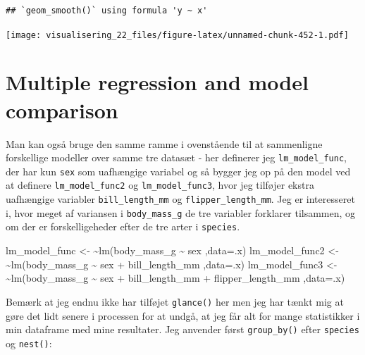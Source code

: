 \documentclass[
]{book}
\newenvironment{Shaded}{\begin{snugshade}}{\end{snugshade}}
\newcommand{\AttributeTok}[1]{\textcolor[rgb]{0.77,0.63,0.00}{#1}}
\newcommand{\ErrorTok}[1]{\textcolor[rgb]{0.64,0.00,0.00}{\textbf{#1}}}
\newcommand{\FunctionTok}[1]{\textcolor[rgb]{0.00,0.00,0.00}{#1}}
\newcommand{\NormalTok}[1]{#1}
\newcommand{\OtherTok}[1]{\textcolor[rgb]{0.56,0.35,0.01}{#1}}
\newcommand{\SpecialCharTok}[1]{\textcolor[rgb]{0.00,0.00,0.00}{#1}}
\begin{document}
\begin{verbatim}
## `geom_smooth()` using formula 'y ~ x'
\end{verbatim}

\texttt{[image: visualisering\_22\_files/figure-latex/unnamed-chunk-452-1.pdf]}

\hypertarget{multiple-regression-and-model-comparison}{%
\section{Multiple regression and model comparison}\label{multiple-regression-and-model-comparison}}

Man kan også bruge den samme ramme i ovenstående til at sammenligne forskellige modeller over samme tre datasæt - her definerer jeg \texttt{lm\_model\_func}, der har kun \texttt{sex} som uafhængige variabel og så bygger jeg op på den model ved at definere \texttt{lm\_model\_func2} og \texttt{lm\_model\_func3}, hvor jeg tilføjer ekstra uafhængige variabler \texttt{bill\_length\_mm} og \texttt{flipper\_length\_mm}. Jeg er interesseret i, hvor meget af variansen i \texttt{body\_mass\_g} de tre variabler forklarer tilsammen, og om der er forskelligeheder efter de tre arter i \texttt{species}.

\begin{Shaded}
\begin{Highlighting}[]
\NormalTok{lm\_model\_func }\OtherTok{\textless{}{-}}  \ErrorTok{\textasciitilde{}}\FunctionTok{lm}\NormalTok{(body\_mass\_g }\SpecialCharTok{\textasciitilde{}}\NormalTok{ sex                                      ,}\AttributeTok{data=}\NormalTok{.x)}
\NormalTok{lm\_model\_func2 }\OtherTok{\textless{}{-}} \ErrorTok{\textasciitilde{}}\FunctionTok{lm}\NormalTok{(body\_mass\_g }\SpecialCharTok{\textasciitilde{}}\NormalTok{ sex }\SpecialCharTok{+}\NormalTok{ bill\_length\_mm                     ,}\AttributeTok{data=}\NormalTok{.x)}
\NormalTok{lm\_model\_func3 }\OtherTok{\textless{}{-}} \ErrorTok{\textasciitilde{}}\FunctionTok{lm}\NormalTok{(body\_mass\_g }\SpecialCharTok{\textasciitilde{}}\NormalTok{ sex }\SpecialCharTok{+}\NormalTok{ bill\_length\_mm }\SpecialCharTok{+}\NormalTok{ flipper\_length\_mm ,}\AttributeTok{data=}\NormalTok{.x)}
\end{Highlighting}
\end{Shaded}

Bemærk at jeg endnu ikke har tilføjet \texttt{glance()} her men jeg har tænkt mig at gøre det lidt senere i processen for at undgå, at jeg får alt for mange statistikker i min dataframe med mine resultater. Jeg anvender først \texttt{group\_by()} efter \texttt{species} og \texttt{nest()}:
\end{document}
